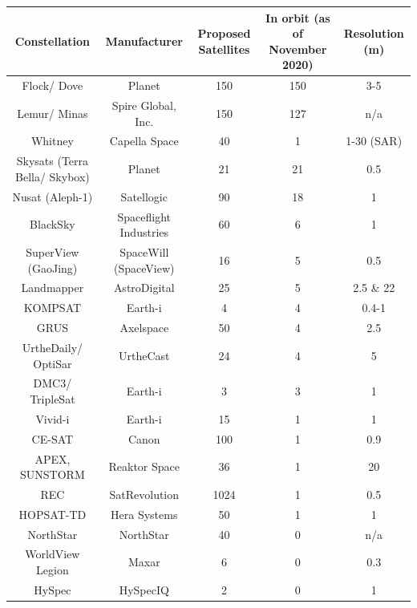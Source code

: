 \bigskip
\begin{center}
\vspace{3mm}
\begin{adjustbox}{width=0.9\textwidth}
\begin{tabular}{||c| c |c |c |c||}
\hline
\textbf{Constellation} & \textbf{Manufacturer} & \textbf{Proposed Satellites} & \textbf{In orbit} (as of November 2020) & \textbf{Resolution (m)}\\
\hline \hline
Flock/ Dove & Planet & 150 & 150 & 3-5\\%
Lemur/ Minas & Spire Global, Inc. & 150 & 127 & n/a\\
Whitney & Capella Space & 40 & 1 & 1-30 (SAR)\\
Skysats (Terra Bella/ Skybox) & Planet & 21 & 21 & 0.5\\
Nusat (Aleph-1) & Satellogic & 90 & 18 & 1\\ %
BlackSky & Spaceflight Industries & 60 & 6 & 1\\%
SuperView (GaoJing) & SpaceWill (SpaceView) & 16 & 5 & 0.5\\%
Landmapper & AstroDigital & 25 & 5 & 2.5 \& 22\\
KOMPSAT & Earth-i & 4 & 4 & 0.4-1\\
GRUS & Axelspace & 50 & 4 & 2.5\\
UrtheDaily/ OptiSar & UrtheCast & 24 & 4 & 5\\
DMC3/ TripleSat & Earth-i & 3 & 3 & 1\\
Vivid-i & Earth-i & 15 & 1 & 1\\
CE-SAT & Canon & 100 & 1 & 0.9\\%
APEX, SUNSTORM & Reaktor Space & 36 & 1 & 20\\%
REC & SatRevolution & 1024 & 1 & 0.5\\
HOPSAT-TD & Hera Systems & 50 & 1 & 1\\
NorthStar & NorthStar & 40 & 0 & n/a\\%
WorldView Legion & Maxar & 6 & 0 & 0.3\\%
HySpec & HySpecIQ & 2 & 0 & 1\\ %




\end{tabular}
\end{adjustbox}
\end{center}
